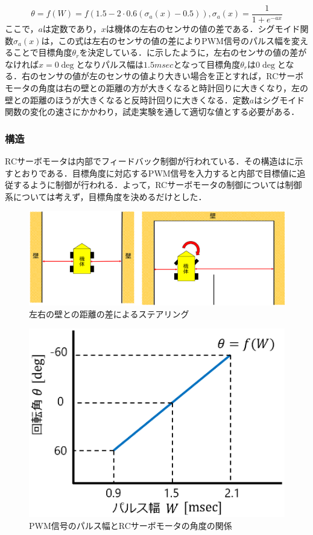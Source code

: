 \begin{equation}  
  \theta = f(W) =f(1.5-2\cdot0.6(\sigma_{a}(x)-0.5)), 
  \sigma_{a}(x)=\frac{1}{1+e^{-ax}}
\end{equation}
ここで，$ a$は定数であり，$ x$は機体の左右のセンサの値の差である．シグモイド関数$\sigma_{a}(x) $は，この式は左右のセンサの値の差によりPWM信号のパルス幅を変えることで目標角度$\theta_{r} $を決定している．に示したように，左右のセンサの値の差がなければ$x=0\unit{\deg}$となりパルス幅は$1.5\unit{msec}$となって目標角度$\theta_{r}$は$0\unit{\deg}$となる．右のセンサの値が左のセンサの値より大きい場合を正とすれば，RCサーボモータの角度は右の壁との距離の方が大きくなると時計回りに大きくなり，左の壁との距離のほうが大きくなると反時計回りに大きくなる．定数$a$はシグモイド関数の変化の速さにかかわり，試走実験を通して適切な値とする必要がある．

\subsubsection{構造}
  RCサーボモータは内部でフィードバック制御が行われている．その構造はに示すとおりである．目標角度に対応するPWM信号を入力すると内部で目標値に追従するように制御が行われる．よって，RCサーボモータの制御については制御系については考えず，目標角度を決めるだけとした．

\begin{figure}[htb]

  \centering
    \includegraphics[width=0.7\hsize]{picture/eps/steering_compa.eps}
  \caption{左右の壁との距離の差によるステアリング}
  \label{fig::steering_compa}
\end{figure}  

\begin{figure}[htb]

  \centering
    \includegraphics[width=0.5\hsize]{picture/eps/RC_pulse.eps}
  \caption{PWM信号のパルス幅とRCサーボモータの角度の関係}
  \label{fig::RC_pulse}
\end{figure} 
 
